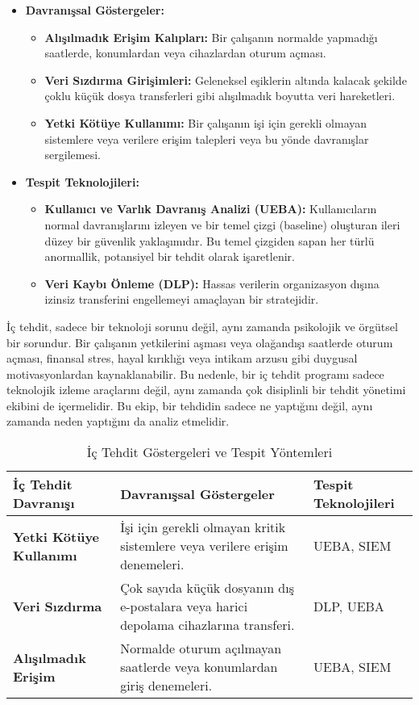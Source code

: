 \begin{itemize}
    \item \textbf{Davranışsal Göstergeler:}
    \begin{itemize}
        \item \textbf{Alışılmadık Erişim Kalıpları:} Bir çalışanın normalde yapmadığı saatlerde, konumlardan veya cihazlardan oturum açması.
        \item \textbf{Veri Sızdırma Girişimleri:} Geleneksel eşiklerin altında kalacak şekilde çoklu küçük dosya transferleri gibi alışılmadık boyutta veri hareketleri.
        \item \textbf{Yetki Kötüye Kullanımı:} Bir çalışanın işi için gerekli olmayan sistemlere veya verilere erişim talepleri veya bu yönde davranışlar sergilemesi.
    \end{itemize}
    \item \textbf{Tespit Teknolojileri:}
    \begin{itemize}
        \item \textbf{Kullanıcı ve Varlık Davranış Analizi (UEBA):} Kullanıcıların normal davranışlarını izleyen ve bir temel çizgi (baseline) oluşturan ileri düzey bir güvenlik yaklaşımıdır. Bu temel çizgiden sapan her türlü anormallik, potansiyel bir tehdit olarak işaretlenir.
        \item \textbf{Veri Kaybı Önleme (DLP):} Hassas verilerin organizasyon dışına izinsiz transferini engellemeyi amaçlayan bir stratejidir.
    \end{itemize}
\end{itemize}

İç tehdit, sadece bir teknoloji sorunu değil, aynı zamanda psikolojik ve örgütsel bir sorundur. Bir çalışanın yetkilerini aşması veya olağandışı saatlerde oturum açması, finansal stres, hayal kırıklığı veya intikam arzusu gibi duygusal motivasyonlardan kaynaklanabilir. Bu nedenle, bir iç tehdit programı sadece teknolojik izleme araçlarını değil, aynı zamanda çok disiplinli bir tehdit yönetimi ekibini de içermelidir. Bu ekip, bir tehdidin sadece ne yaptığını değil, aynı zamanda neden yaptığını da analiz etmelidir.

\begin{table}[htbp]
\centering
\caption{İç Tehdit Göstergeleri ve Tespit Yöntemleri}
\begin{tabularx}{\textwidth}{|p{4cm}|X|p{4cm}|}
\hline
\textbf{İç Tehdit Davranışı} & \textbf{Davranışsal Göstergeler} & \textbf{Tespit Teknolojileri}  \\
\hline
\textbf{Yetki Kötüye Kullanımı} & İşi için gerekli olmayan kritik sistemlere veya verilere erişim denemeleri. & UEBA, SIEM  \\
\hline
\textbf{Veri Sızdırma} & Çok sayıda küçük dosyanın dış e-postalara veya harici depolama cihazlarına transferi. & DLP, UEBA  \\
\hline
\textbf{Alışılmadık Erişim} & Normalde oturum açılmayan saatlerde veya konumlardan giriş denemeleri. & UEBA, SIEM  \\
\hline
\end{tabularx}
\end{table}

